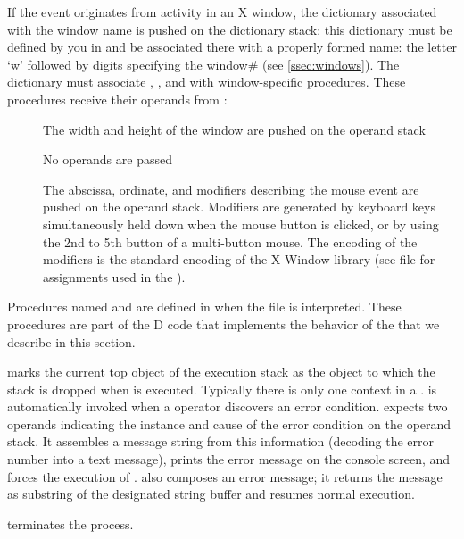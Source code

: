 \noindent If the event originates from activity in an X window, the
dictionary associated with the window name is pushed on the dictionary
stack; this dictionary must be defined by you in  and be
associated there with a properly formed name: the letter `w' followed
by digits specifying the window\# (see \ref{ssec:windows}). The
dictionary must associate , , and
 with window-specific procedures. These procedures
receive their operands from :

\begin{description}
\item[] The width and height of the window are pushed
  on the operand stack
\item[] No operands are passed
\item[] The abscissa, ordinate, and modifiers
  describing the mouse event are pushed on the operand
  stack. Modifiers are generated by keyboard keys simultaneously held
  down when the mouse button is clicked, or by using the 2nd to 5th
  button of a multi-button mouse. The encoding of the modifiers is the
  standard encoding of the X Window library (see file 
  for assignments used in the ).
\end{description}

Procedures named  and  are defined
in  when the file  is interpreted. These
procedures are part of the D code that implements the behavior of the
 that we describe in this section.

 marks the current top object of the execution stack as
the object to which the stack is dropped when  is
executed. Typically there is only one  context in a
.  is automatically invoked when a 
operator discovers an error condition.  expects two
operands indicating the instance and cause of the error condition on
the operand stack. It assembles a message string from this information
(decoding the error number into a text message), prints the error
message on the console screen, and forces the execution of
.  also composes an error message; it
returns the message as substring of the designated string buffer and
resumes normal execution.

 terminates the  process.

